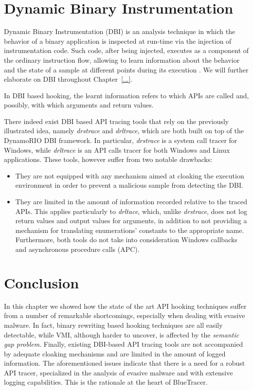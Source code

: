 \section{Dynamic Binary Instrumentation}

Dynamic Binary Instrumentation (DBI) is an analysis technique in which the behavior of a binary application is inspected at run-time via the injection of instrumentation code. Such code, after being injected, executes as a component of the ordinary instruction flow, allowing to learn information about the behavior and the state of a sample at different points during its execution \cite{DBI}. We will further elaborate on DBI throughout Chapter~\ref{...}.

In DBI based hooking, the learnt information refers to which APIs are called and, possibly, with which arguments and return values. 

There indeed exist DBI based API tracing tools that rely on the previously illustrated idea, namely \textit{drstrace} and \textit{drltrace}, which are both built on top of the DynamoRIO \cite{DynamoRIO} DBI framework. In particular, \textit{drstrace} is a system call tracer for Windows, while \textit{drltrace} is an API calls tracer for both Windows and Linux applications. These tools, however suffer from two notable drawbacks:

\begin{itemize}
\item They are not equipped with any mechanism aimed at cloaking the execution environment in order to prevent a malicious sample from detecting the DBI.
\item They are limited in the amount of information recorded relative to the traced APIs. This applies particularly to \textit{drltace}, which, unlike \textit{drstrace}, does not log return values and output values for arguments, in addition to not providing a mechanism for translating enumerations' constants to the appropriate name. Furthermore, both tools do not take into consideration Windows callbacks and asynchronous procedure calls (APC).
\end{itemize}

\section{Conclusion}

In this chapter we showed how the state of the art API hooking techniques suffer from a number of remarkable shortcomings, especially when dealing with evasive malware. In fact, binary rewriting based hooking techniques are all easily detectable, while VMI, although harder to uncover, is affected by the \textit{semantic gap problem}. Finally, existing DBI-based API tracing tools are not accompanied by adequate cloaking mechanisms and are limited in the amount of logged information. The aforementioned issues indicate that there is a need for a robust API tracer, specialized in the analysis of evasive malware and with extensive logging capabilities. This is the rationale at the heart of BlueTracer. 